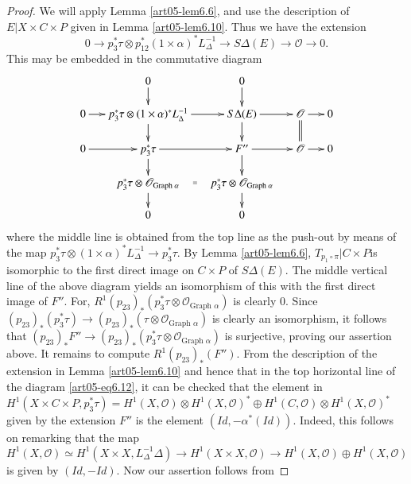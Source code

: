 \begin{proof}
We will apply Lemma \ref{art05-lem6.6}, and use the description of
$E|X\times C\times P$ given in Lemma \ref{art05-lem6.10}. Thus we have
the extension
$$
0\to p^{*}_{3}\tau\otimes
p^{*}_{12}(1\times \alpha)^{*}L^{-1}_{\Delta}\to
S\Delta(E)\to \mathscr{O}\to 0.
$$
This may be embedded in the commutative diagram
\setcounter{equation}{11}
\begin{equation}
\vcenter{
\xymatrix@C=.5cm@R=.5cm{
 & 0\ar[d] & 0\ar[d] & &\\
0\ar[r] & p^{*}_{3}\ar[d] \tau\otimes
(1\times\alpha)^{*}L^{-1}_{\Delta}\ar[r] & S\Delta(E)\ar[d]\ar[r]
& \mathscr{O}\ar@{=}[d]\ar[r] & 0\\
0\ar[r] & p^{*}_{3}\ar[d] \tau\ar[r] & F''\ar[d]\ar[r]
& \mathscr{O}\ar[r] & 0\\
 & p^{*}_{3}\tau\otimes \mathscr{O}_{\text{Graph~}\alpha}\ar@{}[r]|{=}\ar[d] &
 p^{*}_{3}\tau\otimes\mathscr{O}_{\text{Graph~}\alpha}\ar[d] & &\\
 & 0 & 0 & &
}}\label{art05-eq6.12}
\end{equation}
where the middle line is obtained from the top line as the push-out by
means of the map $p^{*}_{3}\tau \otimes
(1\times \alpha)^{*}L^{-1}_{\Delta}\to p^{*}_{3}\tau$. By
Lemma \ref{art05-lem6.6}, $T_{p_{1}\circ \pi}|C\times P$\pageoriginale is isomorphic
to the first direct image on $C\times P$ of $S\Delta(E)$. The middle
vertical line of the above diagram yields an isomorphism of this with
the first direct image of $F''$. For,
$R^{1}(p_{23})_{*}(p^{*}_{3}\tau \otimes \mathscr{O}_{\text{Graph~}\alpha})$
is clearly 0. Since $(p_{23})_{*}(p^{*}_{3}\tau)\to
(p_{23})_{*}(\tau\otimes \mathscr{O}_{\text{Graph~}\alpha})$ is
clearly an isomorphism, it follows that $(p_{23})_{*}F''\to
(p_{23})_{*}(p^{*}_{3}\tau\otimes \mathscr{O}_{\text{Graph~}\alpha})$
is surjective, proving our assertion above. It remains to compute
$R^{1}(p_{23})_{*}(F'')$. From the description of the extension in
Lemma \ref{art05-lem6.10} and hence that in the top horizontal line of
the diagram \ref{art05-eq6.12}, it can be checked that the element in
$H^{1}(X\times C\times P,p^{*}_{3}\tau)=H^{1}(X,\mathscr{O})\otimes
H^{1}(X,\mathscr{O})^{*}\oplus H^{1}(C,\mathscr{O})\otimes
H^{1}(X,\mathscr{O})^{*}$ given by the extension $F''$ is the element
$(Id, -\alpha^{*}(Id))$. Indeed, this follows on remarking that the
map $H^{1}(X,\mathscr{O})\simeq H^{1}(X\times
X,L_{\Delta}^{-1}\Delta)\to H^{1}(X\times X,\mathscr{O})\to
H^{1}(X,\mathscr{O})\oplus H^{1}(X,\mathscr{O})$ is given by
$(Id,-Id)$. Now our assertion follows from
\end{proof}

